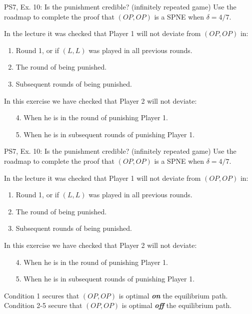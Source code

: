 \begin{frame}{PS7, Ex. 10: Is the punishment credible? (infinitely repeated game)}
  Use the roadmap to complete the proof that $(OP,OP)$ is a SPNE when $\delta=4/7$.\vspace{-4pt}
  \begin{multicols}{2}
    In the lecture it was checked that Player 1 will not deviate from $(OP,OP)$ in:
    \begin{enumerate}
      \item Round 1, or if $(L,L)$ was played in all previous rounds.
      \item The  round of being punished.
      \item Subsequent rounds of being punished.
    \end{enumerate}
    In this exercise we have checked that Player 2 will not deviate:
    \begin{itemize}
      \item[4.] When he is in the  round of punishing Player 1.
      \item[5.] When he is in subsequent rounds of punishing Player 1.
    \end{itemize}
    \vfill\null\columnbreak
    \vfill\null
  \end{multicols}
  \vfill\null
\end{frame}
\begin{frame}{PS7, Ex. 10: Is the punishment credible? (infinitely repeated game)}
  Use the roadmap to complete the proof that $(OP,OP)$ is a SPNE when $\delta=4/7$.\vspace{-4pt}
  \begin{multicols}{2}
    In the lecture it was checked that Player 1 will not deviate from $(OP,OP)$ in:
    \begin{enumerate}
      \item Round 1, or if $(L,L)$ was played in all previous rounds.
      \item The  round of being punished.
      \item Subsequent rounds of being punished.
    \end{enumerate}
    In this exercise we have checked that Player 2 will not deviate:
    \begin{itemize}
      \item[4.] When he is in the  round of punishing Player 1.
      \item[5.] When he is in subsequent rounds of punishing Player 1.
    \end{itemize}
    \vfill\null\columnbreak
    Condition 1 secures that $(OP,OP)$ is optimal \textbf{\textit{on}} the equilibrium path.\\\medskip
    Condition 2-5 secure that $(OP,OP)$ is optimal \textbf{\textit{off}} the equilibrium path.
    \vfill\null
  \end{multicols}
  \vfill\null
\end{frame}
